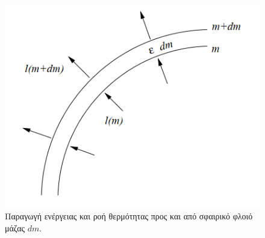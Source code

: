 \begin{figure}[h]
    \centering
    \includegraphics[scale=0.5]{Figures/thermal_equilibrium_scheme.png}
    \caption{Παραγωγή ενέργειας και ροή θερμότητας προς και από σφαιρικό φλοιό μάζας $dm$.}
    \label{fig:thermal_equilibrium_scheme}
\end{figure}

